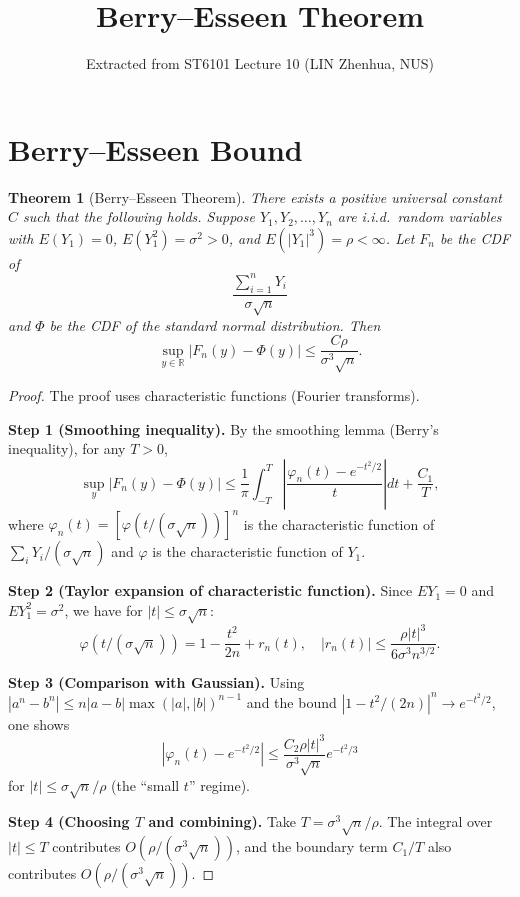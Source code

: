 \documentclass{article}
\title{Berry--Esseen Theorem}
\author{Extracted from ST6101 Lecture 10 (LIN Zhenhua, NUS)}
\newtheorem{theorem}{Theorem}
\begin{document}
\maketitle

\section{Berry--Esseen Bound}

\begin{theorem}[Berry--Esseen Theorem]
There exists a positive universal constant $C$ such that the following holds.
Suppose $Y_1, Y_2, \ldots, Y_n$ are i.i.d.\ random variables with
$E(Y_1) = 0$, $E(Y_1^2) = \sigma^2 > 0$, and $E(|Y_1|^3) = \rho < \infty$.
Let $F_n$ be the CDF of
\[
  \frac{\sum_{i=1}^n Y_i}{\sigma \sqrt{n}}
\]
and $\Phi$ be the CDF of the standard normal distribution. Then
\[
  \sup_{y \in \mathbb{R}} |F_n(y) - \Phi(y)| \le \frac{C \rho}{\sigma^3 \sqrt{n}}.
\]
\end{theorem}

\begin{proof}
The proof uses characteristic functions (Fourier transforms).

\textbf{Step 1 (Smoothing inequality).}
By the smoothing lemma (Berry's inequality), for any $T > 0$,
\[
  \sup_y |F_n(y) - \Phi(y)|
  \le \frac{1}{\pi} \int_{-T}^{T} \left| \frac{\varphi_n(t) - e^{-t^2/2}}{t} \right| dt
  + \frac{C_1}{T},
\]
where $\varphi_n(t) = [\varphi(t/(\sigma\sqrt{n}))]^n$ is the characteristic function of
$\sum_i Y_i / (\sigma\sqrt{n})$ and $\varphi$ is the characteristic function of $Y_1$.

\textbf{Step 2 (Taylor expansion of characteristic function).}
Since $E Y_1 = 0$ and $E Y_1^2 = \sigma^2$, we have for $|t| \le \sigma\sqrt{n}$:
\[
  \varphi(t/(\sigma\sqrt{n})) = 1 - \frac{t^2}{2n} + r_n(t),
  \quad |r_n(t)| \le \frac{\rho |t|^3}{6 \sigma^3 n^{3/2}}.
\]

\textbf{Step 3 (Comparison with Gaussian).}
Using $|a^n - b^n| \le n|a-b| \max(|a|,|b|)^{n-1}$ and the bound
$|1 - t^2/(2n)|^n \to e^{-t^2/2}$, one shows
\[
  |\varphi_n(t) - e^{-t^2/2}| \le \frac{C_2 \rho |t|^3}{\sigma^3 \sqrt{n}} e^{-t^2/3}
\]
for $|t| \le \sigma\sqrt{n}/\rho$ (the ``small $t$'' regime).

\textbf{Step 4 (Choosing $T$ and combining).}
Take $T = \sigma^3 \sqrt{n} / \rho$. The integral over $|t| \le T$ contributes
$O(\rho/(\sigma^3\sqrt{n}))$, and the boundary term $C_1/T$ also contributes
$O(\rho/(\sigma^3\sqrt{n}))$.
\end{proof}
\end{document}
